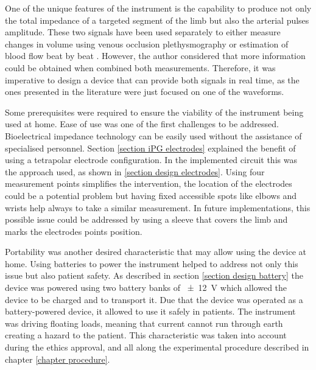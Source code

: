One of the unique features of the instrument is the capability to produce not only the total impedance of a targeted segment of the limb but also the arterial pulses amplitude. These two signals have been used separately to either measure changes in volume using venous occlusion plethysmography \cite{mohapatra1979measurement, costeloe1980continuous, yamakoshi1980limb} or estimation of blood flow beat by beat  \cite{corciova2011peripheral, porter1985measurement, brown1975impedance, marks1985computer}. However, the author considered that more information could be obtained when combined both measurements. Therefore, it was imperative to design a device that can provide both signals in real time, as the ones presented in the literature were just focused on one of the waveforms. 


Some prerequisites were required to ensure the viability of the instrument being used at home. Ease of use was one of the first challenges to be addressed. Bioelectrical impedance technology can be easily used without the assistance of specialised personnel.  Section \ref{section iPG electrodes} explained the benefit of using a tetrapolar electrode configuration. In the implemented circuit this was the approach used, as shown in \ref{section design electrodes}. Using four measurement points simplifies the intervention, the location of the electrodes could be a potential problem but having fixed accessible spots like elbows and wrists help always to take a similar measurement. In future implementations, this possible issue could be addressed by using a sleeve that covers the limb and marks the electrodes points position. 

Portability was another desired characteristic that may allow using the device at home. Using batteries to power the instrument helped to address not only this issue but also patient safety. As described in section \ref{section design battery} the device was powered using two battery banks of \SI{\pm 12}{\volt} which allowed the device to be charged and to transport it. Due that the device was operated as a battery-powered device, it allowed to use it safely in patients. The instrument was driving floating loads, meaning that current cannot run through earth creating a hazard to the patient. This characteristic was taken into account during the ethics approval, and all along the experimental procedure described in chapter \ref{chapter procedure}.


